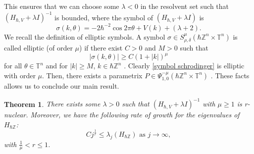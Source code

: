 \documentclass[pdflatex,sn-mathphys-num]{sn-jnl}%
\theoremstyle{thmstyleone}%
\newtheorem{theorem}{Theorem}
\theoremstyle{thmstyletwo}%
\theoremstyle{thmstylethree}%
\begin{document}
This ensures that we can choose some $\lambda<0$ in the resolvent set such that $(H_{\hbar,V}+\lambda I)^{-1}$ is bounded, where the symbol of $(H_{\hbar,V}+\lambda I)$ is
\begin{equation}\label{symbol schrodinger}
\sigma(k,\theta)=-2\hbar^{-2}\cos{2\pi\theta} +V(k)+(\lambda+2).
\end{equation}
We recall the definition of elliptic symbols. A symbol $\sigma\in S^{\mu}_{\rho,\delta}(\hbar\mathbb{Z}^n\times\mathbb{T}^n) $ is called elliptic (of order $\mu$) if there exist $C>0$ and $M>0$ such that 
\[|\sigma(k,\theta)|\geq C(1+|k|)^\mu\]
for all $\theta\in\mathbb{T}^n$ and for $|k|\geq M$, $k\in\hbar\mathbb{Z}^n$ \cite[Definition 4.5]{botchway2024semi}.
Clearly \eqref{symbol schrodinger} is elliptic with order $\mu$. Then, there exists a parametrix $P\in\Psi^{-\mu}_{1,0}(\hbar\mathbb{Z}^n\times\mathbb{T}^n)$ \cite[Theorem 4.7]{botchway2024semi}. These facts allows us to conclude our main result. 
\begin{theorem}
    There exists some $\lambda>0$ such that $(H_{\hbar,V}+\lambda I)^{-1}$ with $\mu\geq 1$ is r-nuclear. Moreover, we have the following rate of growth for the eigenvalues of $H_{\hbar\mathbb{Z}}$:
    \[C j^{\frac{1}{r}} \leq \lambda_j(H_{\hbar\mathbb{Z}})  \text{ as } j\to\infty, \]
    with $\frac{1}{\mu}<r\leq 1$.
\end{theorem}
\end{document}
